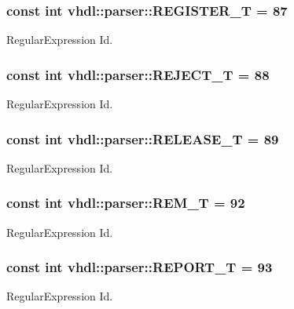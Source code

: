 \subsubsection[{R\+E\+G\+I\+S\+T\+E\+R\+\_\+\+T}]{\setlength{\rightskip}{0pt plus 5cm}const int vhdl\+::parser\+::\+R\+E\+G\+I\+S\+T\+E\+R\+\_\+\+T = 87}\label{namespacevhdl_1_1parser_a507f476823f39b88e87735c164aac313}
Regular\+Expression Id. \hypertarget{namespacevhdl_1_1parser_aa9504d671386824148c477074e899871}{}
\subsubsection[{R\+E\+J\+E\+C\+T\+\_\+\+T}]{\setlength{\rightskip}{0pt plus 5cm}const int vhdl\+::parser\+::\+R\+E\+J\+E\+C\+T\+\_\+\+T = 88}\label{namespacevhdl_1_1parser_aa9504d671386824148c477074e899871}
Regular\+Expression Id. \hypertarget{namespacevhdl_1_1parser_a63dea8eb458d5f8d6717a102f1540629}{}
\subsubsection[{R\+E\+L\+E\+A\+S\+E\+\_\+\+T}]{\setlength{\rightskip}{0pt plus 5cm}const int vhdl\+::parser\+::\+R\+E\+L\+E\+A\+S\+E\+\_\+\+T = 89}\label{namespacevhdl_1_1parser_a63dea8eb458d5f8d6717a102f1540629}
Regular\+Expression Id. \hypertarget{namespacevhdl_1_1parser_a7d546039d7ced7ee86da41dad2d845de}{}
\subsubsection[{R\+E\+M\+\_\+\+T}]{\setlength{\rightskip}{0pt plus 5cm}const int vhdl\+::parser\+::\+R\+E\+M\+\_\+\+T = 92}\label{namespacevhdl_1_1parser_a7d546039d7ced7ee86da41dad2d845de}
Regular\+Expression Id. \hypertarget{namespacevhdl_1_1parser_ac7b08aac83ca44fac459fc032bf3c3af}{}
\subsubsection[{R\+E\+P\+O\+R\+T\+\_\+\+T}]{\setlength{\rightskip}{0pt plus 5cm}const int vhdl\+::parser\+::\+R\+E\+P\+O\+R\+T\+\_\+\+T = 93}\label{namespacevhdl_1_1parser_ac7b08aac83ca44fac459fc032bf3c3af}
Regular\+Expression Id. \hypertarget{namespacevhdl_1_1parser_a73f7fb766dda4d4f0e76a388c96aabfe}{}
